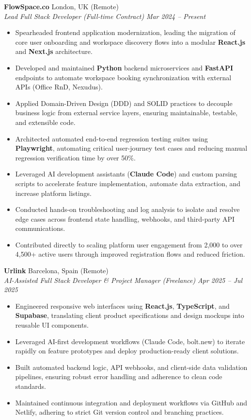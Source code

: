 \documentclass[10pt,a4paper]{article}
\begin{document}
\textbf{FlowSpace.co} \hfill London, UK (Remote) \\
\textit{Lead Full Stack Developer (Full-time Contract)} \hfill \textit{Mar 2024 -- Present}
\begin{itemize}
    \item Spearheaded frontend application modernization, leading the migration of core user onboarding and workspace discovery flows into a modular \textbf{React.js} and \textbf{Next.js} architecture.
    \item Developed and maintained \textbf{Python} backend microservices and \textbf{FastAPI} endpoints to automate workspace booking synchronization with external APIs (Office RnD, Nexudus).
    \item Applied Domain-Driven Design (DDD) and SOLID practices to decouple business logic from external service layers, ensuring maintainable, testable, and extensible code.
    \item Architected automated end-to-end regression testing suites using \textbf{Playwright}, automating critical user-journey test cases and reducing manual regression verification time by over 50\%.
    \item Leveraged AI development assistants (\textbf{Claude Code}) and custom parsing scripts to accelerate feature implementation, automate data extraction, and increase platform listings.
    \item Conducted hands-on troubleshooting and log analysis to isolate and resolve edge cases across frontend state handling, webhooks, and third-party API communications.
    \item Contributed directly to scaling platform user engagement from 2,000 to over 4,500+ active users through improved registration flows and reduced friction.
\end{itemize}

\vspace{3pt}

\textbf{Urlink} \hfill Barcelona, Spain (Remote) \\
\textit{AI-Assisted Full Stack Developer \& Project Manager (Freelance)} \hfill \textit{Apr 2025 -- Jul 2025}
\begin{itemize}
    \item Engineered responsive web interfaces using \textbf{React.js}, \textbf{TypeScript}, and \textbf{Supabase}, translating client product specifications and design mockups into reusable UI components.
    \item Leveraged AI-first development workflows (Claude Code, bolt.new) to iterate rapidly on feature prototypes and deploy production-ready client solutions.
    \item Built automated backend logic, API webhooks, and client-side data validation pipelines, ensuring robust error handling and adherence to clean code standards.
    \item Maintained continuous integration and deployment workflows via GitHub and Netlify, adhering to strict Git version control and branching practices.
\end{itemize}
\end{document}
